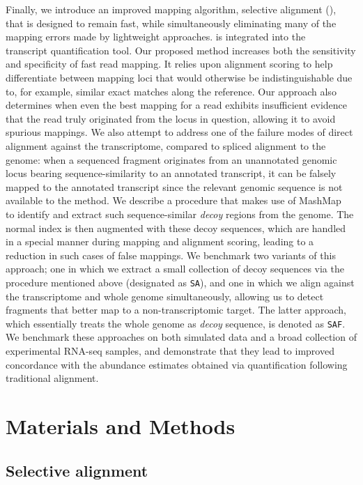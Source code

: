 Finally, we introduce an improved mapping algorithm, selective alignment (\hsa),
that is designed to remain fast, while simultaneously eliminating many of the
mapping errors made by lightweight approaches. \hsa is integrated into the \salmon~\citep{salmon}
transcript quantification tool. Our proposed method increases
both the sensitivity and specificity of fast read mapping. It relies upon
alignment scoring to help differentiate between mapping loci that would
otherwise be indistinguishable due to, for example, similar exact matches along
the reference. Our approach also determines when even the best mapping for a
read exhibits insufficient evidence that the read truly originated from the
locus in question, allowing it to avoid spurious mappings. 
We also attempt to address one of the failure modes of direct alignment against
  the transcriptome, compared to spliced alignment to the genome: when a sequenced fragment originates
  from an unannotated genomic locus bearing sequence-similarity to an annotated
  transcript, it can be falsely mapped to the annotated transcript since the
  relevant genomic sequence is not available to the method. We describe a procedure
  that makes use of MashMap~\citep{jain2018fast} to identify and extract such
  sequence-similar \emph{decoy} regions from the genome. The normal \salmon
  index is then augmented with these decoy sequences, which are handled in a
  special manner during mapping and alignment scoring, leading to a reduction in
  such cases of false mappings. We benchmark two variants of this approach; one in which
we extract a small collection of decoy sequences via the procedure mentioned
above (designated as \texttt{SA}), and one in which we align against the
transcriptome and whole genome simultaneously, allowing us to detect fragments
that better map to a non-transcriptomic target.  The latter approach, which 
essentially treats the whole genome as \emph{decoy} sequence, is denoted as 
\texttt{SAF}. We benchmark these approaches on both simulated data and a broad collection of
experimental RNA-seq samples, and demonstrate that they lead to improved
concordance with the abundance estimates obtained via quantification
following traditional alignment.


\section{Materials and Methods}
\subsection{Selective alignment}
\label{subsec:meth_sa}

